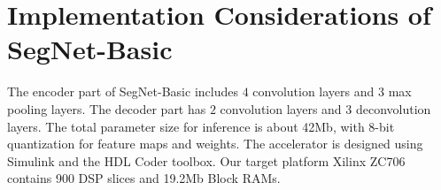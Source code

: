 \documentclass[conference]{IEEEtran}
\begin{document}
\section{Implementation Considerations of SegNet-Basic}\label{sec:SegNet}
\begin{comment}
SegNet \cite{ref:segnet_2017} is one of the pixel level image segmentation neural networks, which is divided into encoder and decoder. SegNet-Basic shown in Fig.~\ref{fig:segnet} is the lite version of SegNet. It balances the computation complexity and performance, making it a better candidate for embedded platforms. We replace the up-sampling layer into deconvolution layer, which is proved having better performance.
\end{comment}
\begin{comment}
\begin{figure}[htbp]
	\centering
	\texttt{[image: fig/segnet.png]}
	\caption{Structure of SegNet-Basic}
	\label{fig:segnet}
\end{figure}
\end{comment}
The encoder part of SegNet-Basic includes $4$ convolution layers and  $3$ max pooling layers. The decoder part has $2$ convolution layers and $3$ deconvolution layers. The total parameter size for inference is about 42Mb, with 8-bit quantization for feature maps and weights. The accelerator is designed using Simulink and the HDL Coder toolbox. Our target platform Xilinx ZC706 contains 900 DSP slices and 19.2Mb Block RAMs.
\begin{comment}
\textcolor{red}{Benefiting from the OF buffer and doubled IF buffers, data transmission and processing can run in parallel.However, the accelerator has to wait until the weights and biases loading completes. } 
\end{comment}
\begin{comment}
Therefore, we spend 11 output 19.2Mb on-chip memory for weight to reduce the number of weight batches loaded from off-chip memory. Each IF buffer is designed to buffer $3\times 1$ sliding vectors from $90\times 120\times 8$ feature maps. Accordingly the OF buffer is capable to cache $90\times 120\times 8$ feature maps as well. In summary, the on-chip memory cost for IF and OF buffers is around 4.8Mb. Correspondingly, 576 DSPs are needed to process 8 channel feature maps simultaneously.
\end{comment}
\end{document}
